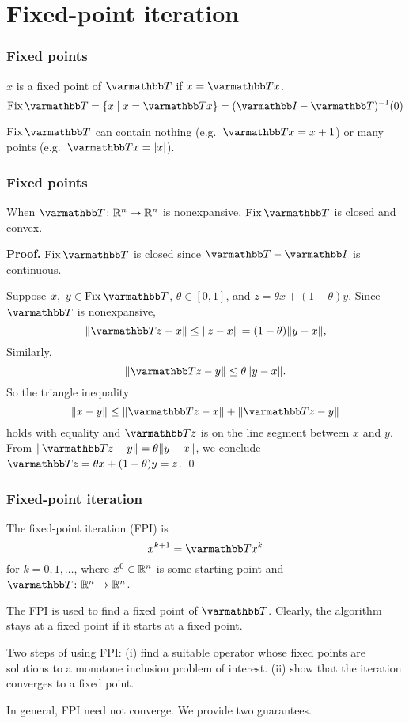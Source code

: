\documentclass[10pt,mathserif]{beamer}
\begin{document}
\section{Fixed-point iteration}

\begin{frame}
\frametitle{Fixed points}
$x$ is a fixed point of $\opT $ if $x=\opT x$.
\[
\fix \opT =
\{ x \mid x=\opT x \} = (\opI-\opT )^{-1}(0)
\]


\vspace{0.2in}
 $\fix \opT $ can contain nothing (e.g.\ $\opT x=x+1$)
or many points (e.g.\ $\opT x=|x|$).
\end{frame}

\begin{frame}
\frametitle{Fixed points}

When $\opT \colon\reals^n\rightarrow \reals^n$ is nonexpansive, $\fix \opT$ is closed and convex.

 \vspace{0.2in}

\textbf{Proof.}
 $\fix \opT $ is closed since $\opT -\opI$ is continuous.

Suppose $x,~y\in \fix \opT $, $\theta \in [0,1]$, and $z=\theta x+ (1-\theta) y  $.
Since $\opT $ is nonexpansive,
\[
\|\opT z-x\| \leq \| z-x \| = (1-\theta) \| y-x \|,
\]
Similarly,
\[
\| \opT z-y\| \leq \theta \| y-x \|.
\]
So the triangle inequality
\[
\|x-y\| \leq \|\opT z-x\| + \|\opT z-y\|
\]
holds with equality and $\opT z$ is on the line segment between
$x$ and $y$.  From $\|\opT z-y\|=\theta \|y-x\|$,
we conclude $\opT z=\theta x+ (1-\theta)y=z$. \qed
\end{frame}



\begin{frame}
\frametitle{Fixed-point iteration}
The fixed-point iteration (FPI) is
\[
x^{k+1}=\opT x^k
\]
for $k=0,1,\dots$, where $x^0\in \mathbb{R}^n$ is some starting point
and $\opT \colon\reals^n\rightarrow\reals^n$.

\vspace{0.2in}
The FPI is used to find a fixed point of $\opT $.
Clearly, the algorithm stays at a fixed point if it starts at a fixed point.


\vspace{0.2in}
Two steps of using FPI:
(i)  find a suitable  operator whose fixed points are solutions to a monotone inclusion problem of interest.
(ii) show that the iteration converges to a fixed point.

\vspace{0.2in}

In general, FPI need not converge.
We provide two guarantees.
\end{frame}
\end{document}
